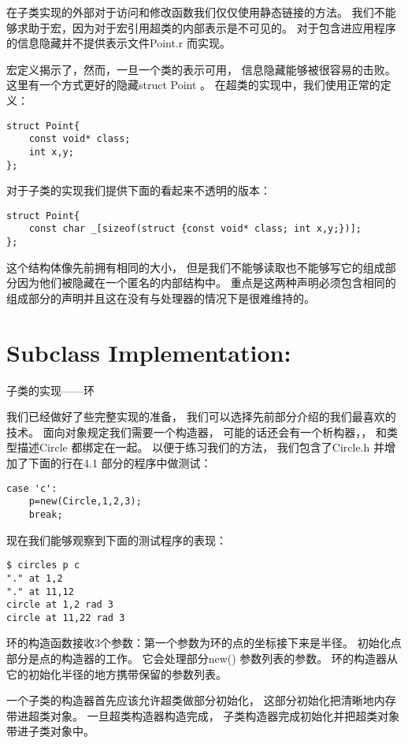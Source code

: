 在子类实现的外部对于访问和修改函数我们仅仅使用静态链接的方法。
我们不能够求助于宏，因为对于宏引用超类的内部表示是不可见的。
对于包含进应用程序的信息隐藏并不提供表示文件Point.r 而实现。

宏定义揭示了，然而，一旦一个类的表示可用，
信息隐藏能够被很容易的击败。
这里有一个方式更好的隐藏struct Point 。
在超类的实现中，我们使用正常的定义：
\begin{lstlisting}
struct Point{
    const void* class;
    int x,y;
};
\end{lstlisting}

对于子类的实现我们提供下面的看起来不透明的版本：
\begin{lstlisting}
struct Point{
    const char _[sizeof(struct {const void* class; int x,y;})];
};
\end{lstlisting}

这个结构体像先前拥有相同的大小，
但是我们不能够读取也不能够写它的组成部分因为他们被隐藏在一个匿名的内部结构中。
重点是这两种声明必须包含相同的组成部分的声明并且这在没有与处理器的情况下是很难维持的。

\section{Subclass Implementation:}
子类的实现——环

我们已经做好了些完整实现的准备，
我们可以选择先前部分介绍的我们最喜欢的技术。
面向对象规定我们需要一个构造器，
可能的话还会有一个析构器，，
和类型描述Circle 都绑定在一起。
以便于练习我们的方法，
我们包含了Circle.h 并增加了下面的行在4.1 部分的程序中做测试：
\begin{lstlisting}
case 'c':
    p=new(Circle,1,2,3);
    break;
\end{lstlisting}

现在我们能够观察到下面的测试程序的表现：
\begin{lstlisting}
$ circles p c
"." at 1,2
"." at 11,12
circle at 1,2 rad 3
circle at 11,22 rad 3
\end{lstlisting}

环的构造函数接收3个参数：第一个参数为环的点的坐标接下来是半径。
初始化点部分是点的构造器的工作。
它会处理部分new() 参数列表的参数。
环的构造器从它的初始化半径的地方携带保留的参数列表。

一个子类的构造器首先应该允许超类做部分初始化，
这部分初始化把清晰地内存带进超类对象。
一旦超类构造器构造完成，
子类构造器完成初始化并把超类对象带进子类对象中。

